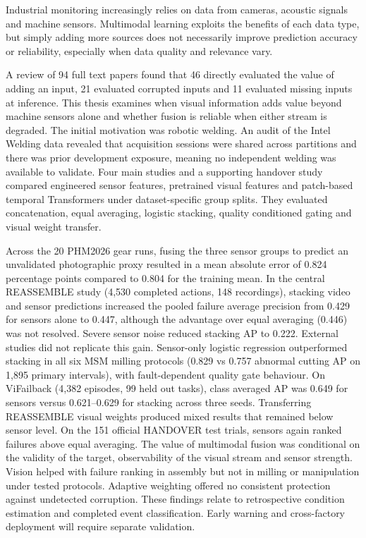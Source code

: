 
Industrial monitoring increasingly relies on data from cameras, acoustic signals and
machine sensors. Multimodal learning exploits the benefits of each data type, but simply
adding more sources does not necessarily improve prediction accuracy or reliability,
especially when data quality and relevance vary.

A review of 94 full text papers found
that 46 directly evaluated the value of adding an input, 21 evaluated corrupted inputs
and 11 evaluated missing inputs at inference. This thesis examines when visual
information adds value beyond machine sensors alone and whether fusion is reliable when
either stream is degraded. The initial motivation was robotic welding. An audit of the
Intel Welding data revealed that acquisition sessions were shared across partitions and
there was prior development exposure, meaning no independent welding was available to
validate. Four main studies and a supporting handover study compared engineered sensor
features, pretrained visual features and patch-based temporal Transformers under
dataset-specific group splits. They evaluated concatenation, equal averaging, logistic
stacking, quality conditioned gating and visual weight transfer.

Across the 20 PHM2026
gear runs, fusing the three sensor groups to predict an unvalidated photographic proxy
resulted in a mean absolute error of 0.824 percentage points compared to 0.804 for the
training mean. In the central REASSEMBLE study (4,530 completed actions, 148
recordings), stacking video and sensor predictions increased the pooled failure average
precision  from 0.429 for sensors alone to 0.447, although the advantage over equal
averaging (0.446) was not resolved. Severe sensor noise reduced stacking AP to 0.222.
External studies did not replicate this gain. Sensor-only logistic regression
outperformed stacking in all six MSM milling protocols (0.829 vs 0.757 abnormal cutting
AP on 1,895 primary intervals), with fault-dependent quality gate behaviour. On
ViFailback (4,382 episodes, 99 held out tasks), class averaged AP was 0.649 for sensors
versus 0.621--0.629 for stacking across three seeds. Transferring REASSEMBLE visual
weights produced mixed results that remained below sensor level. On the 151 official
HANDOVER test trials, sensors again ranked failures above equal averaging. The value of
multimodal fusion was conditional on the validity of the target, observability of the
visual stream and sensor strength. Vision helped with failure ranking in assembly but
not in milling or manipulation under tested protocols. Adaptive weighting offered no
consistent protection against undetected corruption. These findings relate to
retrospective condition estimation and completed event classification. Early warning and
cross-factory deployment will require separate validation.
